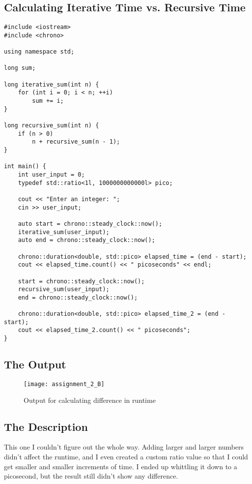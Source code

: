 \documentclass[11pt]{article}
\begin{document}
\subsection*{Calculating Iterative Time vs. Recursive Time}
\begin{lstlisting}
#include <iostream>
#include <chrono>

using namespace std;

long sum;

long iterative_sum(int n) {
    for (int i = 0; i < n; ++i)
        sum += i;
}

long recursive_sum(int n) {
    if (n > 0)
        n + recursive_sum(n - 1);
}

int main() {
    int user_input = 0;
    typedef std::ratio<1l, 1000000000000l> pico;

    cout << "Enter an integer: ";
    cin >> user_input;

    auto start = chrono::steady_clock::now();
    iterative_sum(user_input);
    auto end = chrono::steady_clock::now();

    chrono::duration<double, std::pico> elapsed_time = (end - start);
    cout << elapsed_time.count() << " picoseconds" << endl;

    start = chrono::steady_clock::now();
    recursive_sum(user_input);
    end = chrono::steady_clock::now();

    chrono::duration<double, std::pico> elapsed_time_2 = (end - start);
    cout << elapsed_time_2.count() << " picoseconds";
}

\end{lstlisting}

\subsection*{The Output}
\begin{figure}[H]
    \centering
    \texttt{[image: assignment\_2\_B]}
    \caption{Output for calculating difference in runtime}
    \label{fig:part 6}
\end{figure}

\subsection*{The Description}
This one I couldn't figure out the whole way. Adding larger and larger numbers didn't affect the runtime, and I even created a custom ratio value so that I could get smaller and smaller increments of time. I ended up whittling it down to a picosecond, but the result still didn't show any difference.
\end{document}
